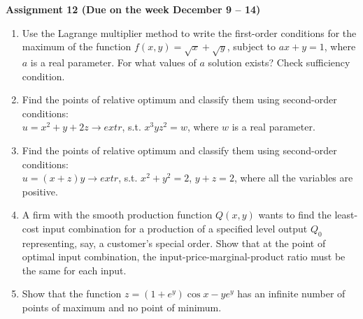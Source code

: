 \documentclass{article}
\begin{document}
\fontsize{14}{21}
\selectfont
\centerline{\textbf{Assignment 12 (Due on the week December 9 -- 14)}}
\fontsize{12}{18}
\selectfont
\begin{enumerate}
\item Use the Lagrange multiplier method to write the first-order conditions for the maximum of the function $f(x,y)=\sqrt{x}+\sqrt{y}$, subject to $ax+y=1$, where $a$ is a real parameter. For what values of $a$ solution exists? Check sufficiency condition.

\item Find the points of relative optimum and classify them using second-order conditions:\\ $u=x^2+y+2z\rightarrow extr$, s.t. $x^3yz^2=w$, where $w$ is a real parameter.

\item Find the points of relative optimum and classify them using second-order conditions:\\ $u=(x+z)y\rightarrow extr$, s.t. $x^2+y^2=2$, $y+z=2$, where all the variables are positive.
    
\item A firm with the smooth production function $Q(x,y)$ wants to find the least-cost input combination for a production of a specified level output $Q_0$ representing, say, a customer's special order. Show that at the point of optimal input combination, the input-price-marginal-product ratio must be the same for each input.
\item Show that the function $z=(1+e^y)\cos x-ye^y$ has an infinite number of points of maximum and no point of minimum.
\end{enumerate}
\end{document}
